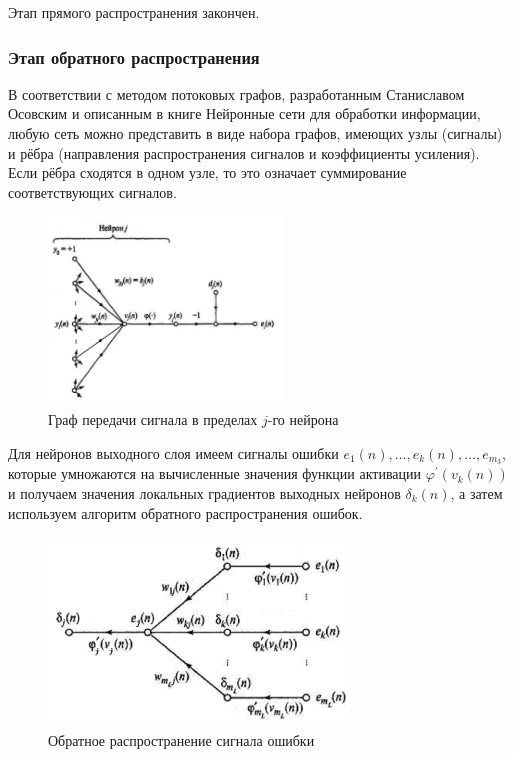 \documentclass[a4paper]{article}
\numberwithin{equation}{subsection}
\begin{document}
Этап прямого распространения закончен.




\subsubsection{Этап обратного распространения}

В соответствии с методом потоковых графов, разработанным Станиславом Осовским и описанным в книге
\glqq Нейронные сети для обработки информации\grqq, любую сеть можно представить в виде набора графов,
 имеющих узлы (сигналы) и рёбра (направления распространения сигналов и коэффициенты усиления).
Если рёбра сходятся в одном узле, то это означает суммирование соответствующих сигналов.

\begin{figure}[H]
    \centering
    \includegraphics[height=5cm]{lec_neuro_08_4_3.png}
    \caption{Граф передачи сигнала в пределах $j$-го нейрона}
    \label{lec_neuro_08_4_3}
\end{figure}

Для нейронов выходного слоя имеем сигналы ошибки $e_1(n),\dots,e_k(n),\dots,e_{m_3}$, которые 
умножаются на вычисленные значения функции активации $\varphi^{\prime}(v_k(n))$ и получаем значения 
локальных градиентов выходных нейронов $\delta_k(n)$, а затем используем алгоритм обратного 
распространения ошибок.

\begin{figure}[htbp]
    \centering
    \includegraphics[height=5cm]{lec_neuro_08_4_5.png}
    \caption{Обратное распространение сигнала ошибки}
    \label{lec_neuro_08_4_5}
\end{figure}
\end{document}
